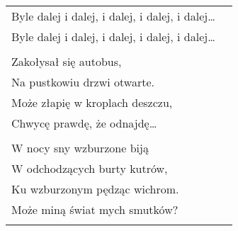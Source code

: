 \documentclass[a5paper]{article}
\begin{document}
\noindent
\begin{tabular}{@{}p{8.5cm}p{3cm}@{}}
Byle dalej i dalej, i dalej, i dalej, i dalej… \\
Byle dalej i dalej, i dalej, i dalej, i dalej…\\ \\

Zakołysał się autobus, \\
Na pustkowiu drzwi otwarte.\\ 
Może złapię w kroplach deszczu, \\
Chwycę prawdę, że odnajdę… \\ \\

W nocy sny wzburzone biją \\
W odchodzących burty kutrów,\\ 
Ku wzburzonym pędząc wichrom. \\
Może miną świat mych smutków?\\ \\
\end{tabular}
\end{document}
